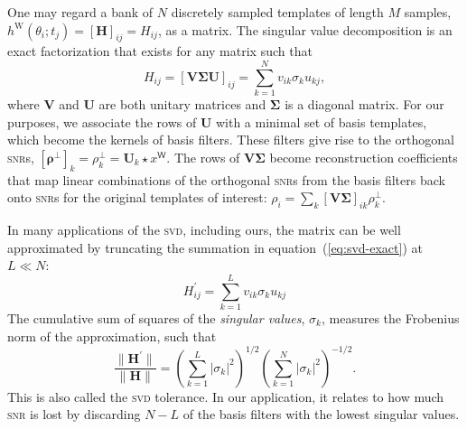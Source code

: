   One may regard a bank of $N$ discretely sampled templates of length $M$ samples, $h^\mathrm W(\theta_i; t_j) = [\mathbf H]_{ij} = H_{ij}$, as a matrix.  The singular value decomposition is an exact factorization that exists for any matrix such that
\begin{equation}
\label{eq:svd-exact}
H_{ij} = [\mathbf {V \Sigma U}]_{ij} = \sum_{k=1}^{N} v_{ik} \sigma_k u_{kj},
\end{equation}
where $\mathbf V$ and $\mathbf U$ are both unitary matrices and $\mathbf \Sigma$ is a diagonal matrix.  For our purposes, we associate the rows of $\mathbf U$ with a minimal set of basis templates, which become the kernels of basis filters.  These filters give rise to the orthogonal \textsc{snr}s, $[\mathbf \rho^\perp]_k = \rho_k^\perp = \mathbf{U}_k \star x^\mathsf{W}$.  The rows of $\mathbf{V \Sigma}$ become reconstruction coefficients that map linear combinations of the orthogonal \textsc{snr}s from the basis filters back onto \textsc{snr}s for the original templates of interest: $\rho_i = \sum_k [\mathbf V \mathbf \Sigma]_{ik} \rho_k^\perp$.

In many applications of the \textsc{svd}, including ours, the matrix can be well approximated by truncating the summation in equation~(\ref{eq:svd-exact}) at $L \ll N$:
\begin{equation}
H_{ij}^\prime = \sum_{k=1}^{L} v_{ik} \sigma_k u_{kj}
\end{equation}
The cumulative sum of squares of the {\em singular values}, $\sigma_k$, measures the Frobenius norm of the approximation, such that
\begin{equation}
\frac{\| \mathbf H^\prime \|}{\| \mathbf H \|} = \left(\sum_{k=1}^{L} |\sigma_k|^2\right)^{1/2} \left(\sum_{k=1}^{N} |\sigma_k|^2\right)^{-1/2}.
\end{equation}
This is also called the \textsc{svd} tolerance.  In our application, it relates to how much \textsc{snr} is lost by discarding $N - L$ of the basis filters with the lowest singular values.

